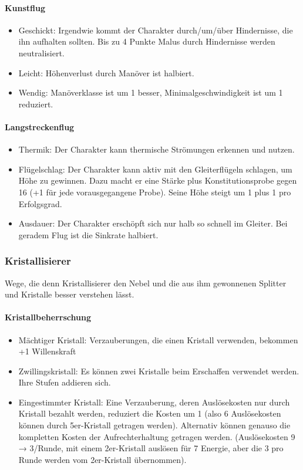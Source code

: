 \documentclass{article}
\begin{document}
\paragraph{Kunstflug}

\begin{itemize}
\item Geschickt: Irgendwie kommt der Charakter durch/um/über Hindernisse, die ihn aufhalten sollten. Bis zu 4 Punkte Malus durch Hindernisse werden neutralisiert.
\item Leicht: Höhenverlust durch Manöver ist halbiert.
\item Wendig: Manöverklasse ist um 1 besser, Minimalgeschwindigkeit ist um 1 reduziert.
\end{itemize}

\paragraph{Langstreckenflug}

\begin{itemize}
\item Thermik: Der Charakter kann thermische Strömungen erkennen und nutzen.
\item Flügelschlag: Der Charakter kann aktiv mit den Gleiterflügeln schlagen, um Höhe zu gewinnen. Dazu macht er eine Stärke plus Konstitutionsprobe gegen 16 (+1 für jede vorausgegangene Probe). Seine Höhe steigt um 1 plus 1 pro Erfolgsgrad.
\item Ausdauer: Der Charakter erschöpft sich nur halb so schnell im Gleiter. Bei geradem Flug ist die Sinkrate halbiert.
\end{itemize}

\subsubsection{Kristallisierer}

Wege, die denn Kristallisierer den Nebel und die aus ihm gewonnenen Splitter und Kristalle besser verstehen lässt.

\paragraph{Kristallbeherrschung}

\begin{itemize}
\item Mächtiger Kristall: Verzauberungen, die einen Kristall verwenden, bekommen +1 Willenskraft
\item Zwillingskristall: Es können zwei Kristalle beim Erschaffen verwendet werden. Ihre Stufen addieren sich.
\item Eingestimmter Kristall: Eine Verzauberung, deren Auslösekosten nur durch Kristall bezahlt werden, reduziert die Kosten um 1 (also 6 Auslösekosten können durch 5er-Kristall getragen werden). Alternativ können genauso die kompletten Kosten der Aufrechterhaltung getragen werden. (Auslösekosten 9 → 3/Runde, mit einem 2er-Kristall auslösen für 7 Energie, aber die 3 pro Runde werden vom 2er-Kristall übernommen).
\end{itemize}
\end{document}
